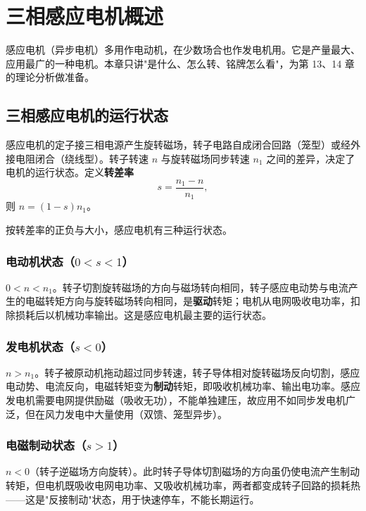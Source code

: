 \chapter{三相感应电机概述}

感应电机（异步电机）多用作电动机，在少数场合也作发电机用。它是产量最大、应用最广的一种电机。本章只讲"是什么、怎么转、铭牌怎么看"，为第 13、14 章的理论分析做准备。

\section{三相感应电机的运行状态}

感应电机的定子接三相电源产生旋转磁场，转子电路自成闭合回路（笼型）或经外接电阻闭合（绕线型）。转子转速 $n$ 与旋转磁场同步转速 $n_1$ 之间的差异，决定了电机的运行状态。定义\textbf{转差率}
\begin{equation}
s=\frac{n_1-n}{n_1},
\end{equation}
则 $n=(1-s)n_1$。


按转差率的正负与大小，感应电机有三种运行状态。

\subsection{电动机状态（$0<s<1$）}
$0<n<n_1$。转子切割旋转磁场的方向与磁场转向相同，转子感应电动势与电流产生的电磁转矩方向与旋转磁场转向相同，是\textbf{驱动}转矩；电机从电网吸收电功率，扣除损耗后以机械功率输出。这是感应电机最主要的运行状态。

\subsection{发电机状态（$s<0$）}
$n>n_1$。转子被原动机拖动超过同步转速，转子导体相对旋转磁场反向切割，感应电动势、电流反向，电磁转矩变为\textbf{制动}转矩，即吸收机械功率、输出电功率。感应发电机需要电网提供励磁（吸收无功），不能单独建压，故应用不如同步发电机广泛，但在风力发电中大量使用（双馈、笼型异步）。

\subsection{电磁制动状态（$s>1$）}
$n<0$（转子逆磁场方向旋转）。此时转子导体切割磁场的方向虽仍使电流产生制动转矩，但电机既吸收电网电功率、又吸收机械功率，两者都变成转子回路的损耗热——这是"反接制动"状态，用于快速停车，不能长期运行。

